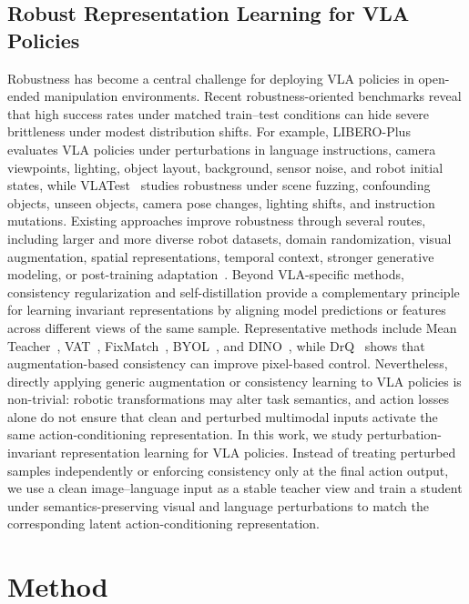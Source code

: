\documentclass[letterpaper]{article} %
\begin{document}
\subsection{Robust Representation Learning for VLA Policies}
Robustness has become a central challenge for deploying VLA policies in open-ended manipulation environments. Recent robustness-oriented benchmarks reveal that high success rates under matched train--test conditions can hide severe brittleness under modest distribution shifts. For example, LIBERO-Plus~\cite{DBLP:journals/corr/abs-2510-13626} evaluates VLA policies under perturbations in language instructions, camera viewpoints, lighting, object layout, background, sensor noise, and robot initial states, while VLATest~\cite{DBLP:journals/pacmse/WangZSHSM25} studies robustness under scene fuzzing, confounding objects, unseen objects, camera pose changes, lighting shifts, and instruction mutations. Existing approaches improve robustness through several routes, including larger and more diverse robot datasets, domain randomization, visual augmentation, spatial representations, temporal context, stronger generative modeling, or post-training adaptation~\cite{domain_randomization,robomimic,bridge_data,DBLP:conf/nips/LiuZGFLZS23,DBLP:conf/corl/LiHGMPWFLSKL0F024,ript_vla,robustvla}. Beyond VLA-specific methods, consistency regularization and self-distillation provide a complementary principle for learning invariant representations by aligning model predictions or features across different views of the same sample. Representative methods include Mean Teacher~\cite{DBLP:conf/nips/TarvainenV17}, VAT~\cite{vat}, FixMatch~\cite{fixmatch}, BYOL~\cite{DBLP:conf/nips/GrillSATRBDPGAP20}, and DINO~\cite{dino}, while DrQ~\cite{drq} shows that augmentation-based consistency can improve pixel-based control. Nevertheless, directly applying generic augmentation or consistency learning to VLA policies is non-trivial: robotic transformations may alter task semantics, and action losses alone do not ensure that clean and perturbed multimodal inputs activate the same action-conditioning representation. In this work, we study perturbation-invariant representation learning for VLA policies. Instead of treating perturbed samples independently or enforcing consistency only at the final action output, we use a clean image--language input as a stable teacher view and train a student under semantics-preserving visual and language perturbations to match the corresponding latent action-conditioning representation.

\section{Method}
\end{document}
